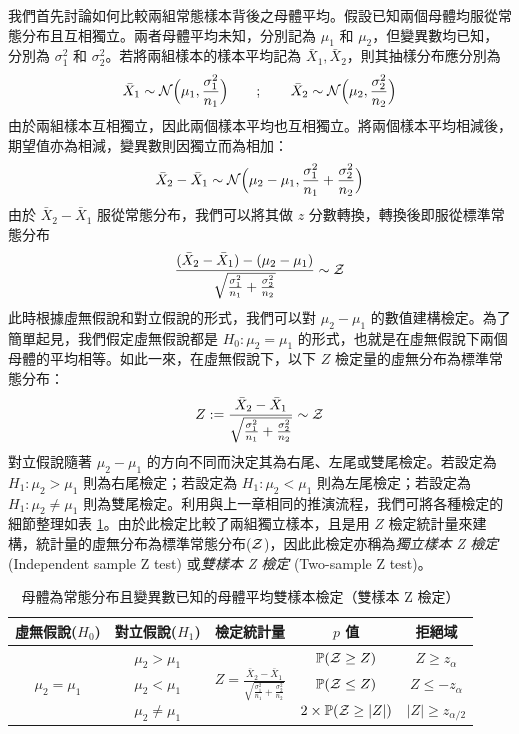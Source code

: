     我們首先討論如何比較兩組常態樣本背後之母體平均。假設已知兩個母體均服從常態分布且互相獨立。兩者母體平均未知，分別記為 $\mu_1$ 和 $\mu_2$，但變異數均已知，分別為 $\sigma_1^2$ 和 $\sigma_2^2$。若將兩組樣本的樣本平均記為 $\bar{X}_1, \bar{X}_2$，則其抽樣分布應分別為
    \smallskip
    \[\bar{X}_1 \sim \mathcal{N}\Big(\mu_1, \frac{\sigma_1^2}{n_1}\Big) \qquad ; \qquad \bar{X}_2 \sim \mathcal{N}\Big(\mu_2, \frac{\sigma_2^2}{n_2}\Big)\]
    \smallskip
    由於兩組樣本互相獨立，因此兩個樣本平均也互相獨立。將兩個樣本平均相減後，期望值亦為相減，變異數則因獨立而為相加：
    \smallskip
    \[\bar{X}_2-\bar{X}_1 \sim \mathcal{N} \Big(\mu_2 - \mu_1, \frac{\sigma_1^2}{n_1} + \frac{\sigma_2^2}{n_2}\Big)\]
    \smallskip
    由於 $\bar{X}_2-\bar{X}_1$ 服從常態分布，我們可以將其做 $z$ 分數轉換，轉換後即服從標準常態分布
    \smallskip
    \[\frac{(\bar{X}_2-\bar{X}_1)-(\mu_2-\mu_1)}{\sqrt{\frac{\sigma_1^2}{n_1} + \frac{\sigma_2^2}{n_2}}} \sim \mathcal{Z}\]
    \smallskip
    此時根據虛無假說和對立假說的形式，我們可以對 $\mu_2-\mu_1$ 的數值建構檢定。為了簡單起見，我們假定虛無假說都是 $H_0: \mu_2 = \mu_1$ 的形式，也就是在虛無假說下兩個母體的平均相等。如此一來，在虛無假說下，以下 $Z$ 檢定量的虛無分布為標準常態分布：
    \smallskip
    \[Z := \frac{\bar{X}_2-\bar{X}_1}{\sqrt{\frac{\sigma_1^2}{n_1} + \frac{\sigma_2^2}{n_2}}} \sim \mathcal{Z}\]
    \smallskip
    對立假說隨著 $\mu_2-\mu_1$ 的方向不同而決定其為右尾、左尾或雙尾檢定。若設定為 $H_1: \mu_2 > \mu_1$ 則為右尾檢定；若設定為 $H_1: \mu_2 < \mu_1$ 則為左尾檢定；若設定為 $H_1: \mu_2 \ne \mu_1$ 則為雙尾檢定。利用與上一章相同的推演流程，我們可將各種檢定的細節整理如表 \ref{tab:two_sample_z}。由於此檢定比較了兩組獨立樣本，且是用 $Z$ 檢定統計量來建構，統計量的虛無分布為標準常態分布($\mathcal{Z}$)，因此此檢定亦稱為\textit{獨立樣本 Z 檢定} (Independent sample Z test) 或\textit{雙樣本 Z 檢定} (Two-sample Z test)。

    \begin{table}[htbp]
        \begin{center}
            \begin{tabular}{ccccc}
                \toprule
                虛無假說($H_0$) & 對立假說($H_1$) & 檢定統計量 & $p$ 值 & 拒絕域\\
                \hline
                \multirow{3}{*}{$\mu_2 = \mu_1$} & $\mu_2 > \mu_1$ & \multirow{3}{*}{$Z = \frac{\bar{X}_2-\bar{X}_1}{\sqrt{\frac{\sigma_1^2}{n_1}+\frac{\sigma_2^2}{n_2}}}$} & $\mathbb{P}(\mathcal{Z} \ge Z)$ & $Z \ge z_{\alpha}$\\
                & $\mu_2 < \mu_1$ & &$\mathbb{P}(\mathcal{Z} \le Z)$&$Z \le -z_{\alpha}$\\
                & $\mu_2 \ne \mu_1$ & &$2\times\mathbb{P}(\mathcal{Z} \ge |Z|)$&$|Z| \ge z_{\alpha/2}$\\
                \bottomrule
            \end{tabular}
            \caption{母體為常態分布且變異數已知的母體平均雙樣本檢定（雙樣本 Z 檢定）\label{tab:two_sample_z}}
        \end{center}
    \end{table}

